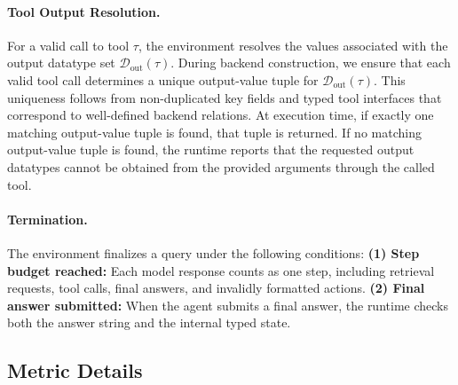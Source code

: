 \paragraph{Tool Output Resolution.}
For a valid call to tool $\tau$, the environment resolves the values associated with the output datatype set $\mathcal{D}_{\mathrm{out}}(\tau)$.
During backend construction, we ensure that each valid tool call determines a unique output-value tuple for $\mathcal{D}_{\mathrm{out}}(\tau)$.
This uniqueness follows from non-duplicated key fields and typed tool interfaces that correspond to well-defined backend relations.
At execution time, if exactly one matching output-value tuple is found, that tuple is returned.
If no matching output-value tuple is found, the runtime reports that the requested output datatypes cannot be obtained from the provided arguments through the called tool.

\paragraph{Termination.}
The environment finalizes a query under the following conditions:
\textbf{(1) Step budget reached:} Each model response counts as one step, including retrieval requests, tool calls, final answers, and invalidly formatted actions.
\textbf{(2) Final answer submitted:} When the agent submits a final answer, the runtime checks both the answer string and the internal typed state. 

\subsection{Metric Details}
\label{app:metric-details}

